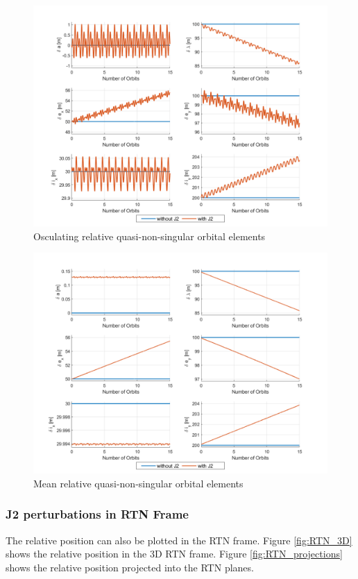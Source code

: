 \begin{figure}[H]
    \centering
    \includegraphics[width=0.75\linewidth]{sim/figures/PS4/ROE_osc_SV2.png}
    \caption{Osculating relative quasi-non-singular orbital elements}
    \label{fig:osc_ROE}
\end{figure}

\begin{figure}[H]
    \centering
    \includegraphics[width=0.75\linewidth]{sim/figures/PS4/ROE_mean_SV2.png}
    \caption{Mean relative quasi-non-singular orbital elements}
    \label{fig:mean_ROE}
\end{figure}

\subsubsection{J2 perturbations in RTN Frame}\label{sec:J2_RTN_frame}
The relative position can also be plotted in the RTN frame. Figure \ref{fig:RTN_3D} shows the relative position in the 3D RTN frame. Figure \ref{fig:RTN_projections} shows the relative position projected into the RTN planes.


